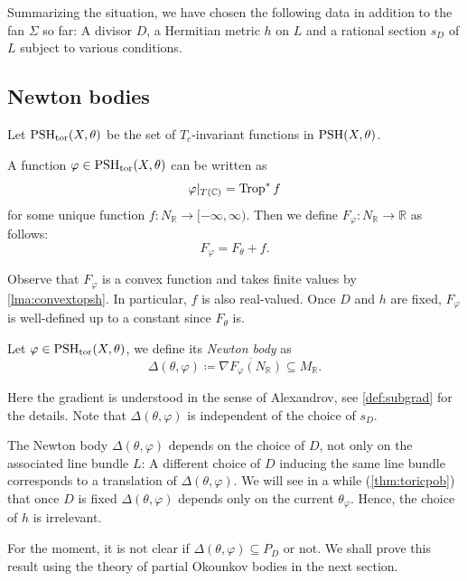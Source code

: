 Summarizing the situation, we have chosen the following data in addition to the fan $\Sigma$ so far: A divisor $D$, a Hermitian metric $h$ on $L$ and a rational section $s_D$ of $L$ subject to various conditions.

\subsection{Newton bodies}
\label{subsec:newton_big}
Let $\mathrm{PSH}_{\mathrm{tor}}(X,\theta)$ be the set of $T_c$-invariant functions in $\mathrm{PSH}(X,\theta)$.

\begin{definition}\label{def:toric-big:L416}
    A function $\varphi\in \mathrm{PSH}_{\mathrm{tor}}(X,\theta)$ can be written as
\[
\varphi|_{T(\mathbb{C})}=\operatorname{Trop}^*f
\]
for some unique function $f\colon N_{\mathbb{R}}\rightarrow [-\infty,\infty)$. Then we define $F_{\varphi}\colon N_{\mathbb{R}}\rightarrow \mathbb{R}$ as follows:
\begin{equation}\label{eq:Fvarphibig1}
F_{\varphi}=F_{\theta}+f.
\end{equation}
\end{definition}
Observe that $F_{\varphi}$ is a convex function and takes finite values by \cref{lma:convextopsh}. In particular, $f$ is also real-valued.
Once $D$ and $h$ are fixed, $F_{\varphi}$ is well-defined up to a constant since $F_{\theta}$ is.

\begin{definition}\label{def:toric-big:L430}
    Let $\varphi\in \mathrm{PSH}_{\mathrm{tor}}(X,\theta)$, we define its \emph{Newton body} as
    \[
    \Delta(\theta,\varphi)\coloneqq \overline{\nabla F_{\varphi}(N_{\mathbb{R}})}\subseteq M_{\mathbb{R}}.
    \]
    \index{$\Delta(\theta,\varphi)$}
\end{definition}
Here the gradient is understood in the sense of Alexandrov, see \cref{def:subgrad} for the details.
Note that $\Delta(\theta,\varphi)$ is independent of the choice of $s_D$.

The Newton body $\Delta(\theta,\varphi)$ depends on the choice of $D$, not only on the associated line bundle $L$: A different choice of $D$ inducing the same line bundle corresponds to a translation of $\Delta(\theta,\varphi)$. We will see in a while (\cref{thm:toricpob}) that once $D$ is fixed $\Delta(\theta,\varphi)$ depends only on the current $\theta_{\varphi}$. Hence, the choice of $h$ is irrelevant.

For the moment, it is not clear if $\Delta(\theta,\varphi)\subseteq P_D$ or not. We shall prove this result using the theory of partial Okounkov bodies in the next section.

